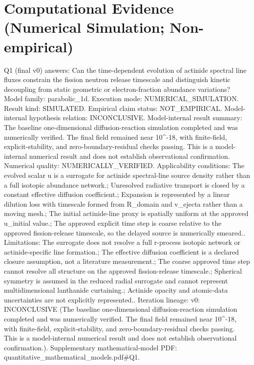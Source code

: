 \documentclass[conference]{IEEEtran}
\begin{document}
\section{Computational Evidence (Numerical Simulation; Non-empirical)}
Q1 (final v0) answers: Can the time-dependent evolution of actinide spectral line fluxes constrain the fission neutron release timescale and distinguish kinetic decoupling from static geometric or electron-fraction abundance variations? Model family: parabolic\_1d. Execution mode: NUMERICAL\_SIMULATION. Result kind: SIMULATED. Empirical claim status: NOT\_EMPIRICAL. Model-internal hypothesis relation: INCONCLUSIVE. Model-internal result summary: The baseline one-dimensional diffusion-reaction simulation completed and was numerically verified. The final field remained near 10\textasciicircum{}-18, with finite-field, explicit-stability, and zero-boundary-residual checks passing. This is a model-internal numerical result and does not establish observational confirmation. Numerical quality: NUMERICALLY\_VERIFIED. Applicability conditions: The evolved scalar u is a surrogate for actinide spectral-line source density rather than a full isotopic abundance network.; Unresolved radiative transport is closed by a constant effective diffusion coefficient.; Expansion is represented by a linear dilution loss with timescale formed from R\_domain and v\_ejecta rather than a moving mesh.; The initial actinide-line proxy is spatially uniform at the approved u\_initial value.; The approved explicit time step is coarse relative to the approved fission-release timescale, so the delayed source is numerically smeared.. Limitations: The surrogate does not resolve a full r-process isotopic network or actinide-specific line formation.; The effective diffusion coefficient is a declared closure assumption, not a literature measurement.; The coarse approved time step cannot resolve all structure on the approved fission-release timescale.; Spherical symmetry is assumed in the reduced radial surrogate and cannot represent multidimensional lanthanide curtaining.; Actinide opacity and atomic-data uncertainties are not explicitly represented.. Iteration lineage: v0: INCONCLUSIVE (The baseline one-dimensional diffusion-reaction simulation completed and was numerically verified. The final field remained near 10\textasciicircum{}-18, with finite-field, explicit-stability, and zero-boundary-residual checks passing. This is a model-internal numerical result and does not establish observational confirmation.). Supplementary mathematical-model PDF: quantitative\_mathematical\_models.pdf\#Q1.
\end{document}
